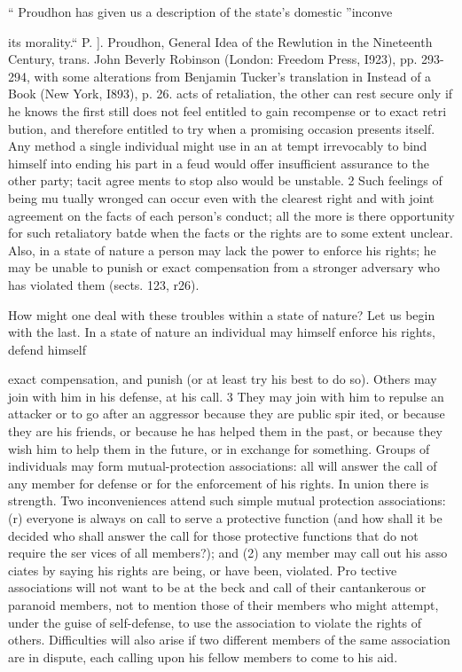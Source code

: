 \documentclass[11pt,openany]{book}
\begin{document}
`` Proudhon has given us a description of the state's domestic ''inconve

its morality.`` P. ]. Proudhon, General Idea of the Rewlution in the Nineteenth Century, trans. John Beverly Robinson (London: Freedom Press, I923), pp. 293-294, with some alterations from Benjamin Tucker's translation in Instead of a Book (New York, I893), p. 26. acts of retaliation, the other can rest secure only if he knows the first still does not feel entitled to gain recompense or to exact retri bution, and therefore entitled to try when a promising occasion presents itself. Any method a single individual might use in an at tempt irrevocably to bind himself into ending his part in a feud would offer insufficient assurance to the other party; tacit agree ments to stop also would be unstable. 2 Such feelings of being mu tually wronged can occur even with the clearest right and with joint agreement on the facts of each person's conduct; all the more is there opportunity for such retaliatory batde when the facts or the rights are to some extent unclear. Also, in a state of nature a person may lack the power to enforce his rights; he may be unable to punish or exact compensation from a stronger adversary who has violated them (sects. 123, r26). 

How might one deal with these troubles within a state of nature? Let us begin with the last. In a state of nature an individual may himself enforce his rights, defend himself 

exact compensation, and punish (or at least try his best to do so). Others may join with him in his defense, at his call. 3 They may join with him to repulse an attacker or to go after an aggressor because they are public spir ited, or because they are his friends, or because he has helped them in the past, or because they wish him to help them in the future, or in exchange for something. Groups of individuals may form mutual-protection associations: all will answer the call of any member for defense or for the enforcement of his rights. In union there is strength. Two inconveniences attend such simple mutual protection associations: (r) everyone is always on call to serve a protective function (and how shall it be decided who shall answer the call for those protective functions that do not require the ser vices of all members?); and (2) any member may call out his asso ciates by saying his rights are being, or have been, violated. Pro tective associations will not want to be at the beck and call of their cantankerous or paranoid members, not to mention those of their members who might attempt, under the guise of self-defense, to use the association to violate the rights of others. Difficulties will also arise if two different members of the same association are in dispute, each calling upon his fellow members to come to his aid. 
\end{document}
